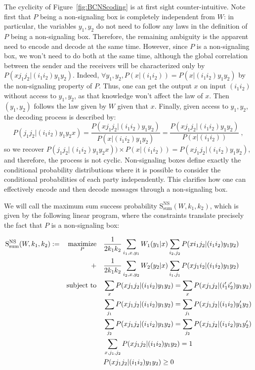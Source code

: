 The cyclicity of Figure~\ref{fig:BCNScoding} is at first sight counter-intuitive. Note first that $P$ being a non-signaling box is completely independent from $W$: in particular, the variables $y_1,y_2$ do not need to follow any laws in the definition of $P$ being a non-signaling box. Therefore, the remaining ambiguity is the apparent need to encode and decode at the same time. However, since $P$ is a non-signaling box, we won't need to do both at the same time, although the global correlation between the sender and the receivers will be characterized only by $P(xj_1j_2|(i_1i_2)y_1y_2)$. Indeed, $\forall y_1,y_2, P(x|(i_1i_2)) = P(x|(i_1i_2)y_1y_2)$ by the non-signaling property of $P$. Thus, one can get the output $x$ on input $(i_1i_2)$ without access to $y_1,y_2$, as that knowledge won't affect the law of $x$. Then $(y_1,y_2)$ follows the law given by $W$ given that $x$. Finally, given access to $y_1,y_2$, the decoding process is described by:
          \[ P(j_1j_2|(i_1i_2) y_1 y_2 x) = \frac{P(xj_1j_2|(i_1i_2) y_1 y_2)}{P(x|(i_1i_2) y_1 y_2)} =  \frac{P(xj_1j_2|(i_1i_2) y_1 y_2)}{P(x|(i_1i_2))}  \ , \]
          so we recover $P(j_1j_2|(i_1i_2) y_1 y_2 x)) \times P(x |(i_1 i_2)) = P(xj_1j_2|(i_1i_2)y_1y_2)$, and therefore, the process is not cyclic. Non-signaling boxes define exactly the conditional probability distributions where it is possible to consider the conditional probabilities of each party independently. This clarifies how one can effectively encode and then decode messages through a non-signaling box.

We will call the maximum sum success probability $\mathrm{S}_{\text{sum}}^{\mathrm{NS}}(W,k_1,k_2)$, which is given by the following linear program, where the constraints translate precisely the fact that $P$ is a non-signaling box:

\begin{equation}
  \begin{aligned}
    \mathrm{S}_{\text{sum}}^{\mathrm{NS}}(W,k_1,k_2) := &&\underset{P}{\operatorname{\text{maximize}}} &&& \frac{1}{2k_1k_2}\sum_{i_1,x,y_1} W_1(y_1|x)\sum_{i_2,j_2} P(xi_1j_2|(i_1i_2)y_1y_2)\\
    &&+&&& \frac{1}{2k_1k_2}\sum_{i_2,x,y_2} W_2(y_2|x) \sum_{i_1,j_1} P(xj_1i_2|(i_1i_2)y_1y_2)\\
    &&\operatorname{\text{subject to}} &&& \sum_{x} P(xj_1j_2|(i_1i_2)y_1y_2) = \sum_{x} P(xj_1j_2|(i_1'i_2')y_1y_2)\\
    &&&&& \sum_{j_1} P(xj_1j_2|(i_1i_2)y_1y_2) = \sum_{j_1} P(xj_1j_2|(i_1i_2)y_1'y_2)\\
    &&&&& \sum_{j_2} P(xj_1j_2|(i_1i_2)y_1y_2) = \sum_{j_2} P(xj_1j_2|(i_1i_2)y_1y_2')\\
    &&&&& \sum_{x,j_1,j_2} P(xj_1j_2|(i_1i_2)y_1y_2) = 1\\
    &&&&& P(xj_1j_2|(i_1i_2)y_1y_2) \geq 0
  \end{aligned}
\end{equation}


